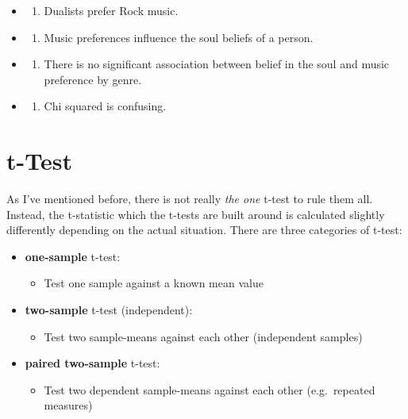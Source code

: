 \documentclass[
]{book}
\providecommand{\tightlist}{%
  \setlength{\itemsep}{0pt}\setlength{\parskip}{0pt}}
\begin{document}
\begin{itemize}
\tightlist
\item
  \begin{enumerate}
  \def\labelenumi{(\Alph{enumi})}
  \tightlist
  \item
    Dualists prefer Rock music.\\
  \end{enumerate}
\item
  \begin{enumerate}
  \def\labelenumi{(\Alph{enumi})}
  \setcounter{enumi}{1}
  \tightlist
  \item
    Music preferences influence the soul beliefs of a person.\\
  \end{enumerate}
\item
  \begin{enumerate}
  \def\labelenumi{(\Alph{enumi})}
  \setcounter{enumi}{2}
  \tightlist
  \item
    There is no significant association between belief in the soul and music preference by genre.\\
  \end{enumerate}
\item
  \begin{enumerate}
  \def\labelenumi{(\Alph{enumi})}
  \setcounter{enumi}{3}
  \tightlist
  \item
    Chi squared is confusing.
  \end{enumerate}
\end{itemize}

\section{t-Test}\label{t-test}

As I've mentioned before, there is not really \emph{the one} t-test to rule them all.
Instead, the t-statistic which the t-tests are built around is calculated slightly differently depending on the actual situation.
There are three categories of t-test:

\begin{itemize}
\tightlist
\item
  \textbf{one-sample} t-test:

  \begin{itemize}
  \tightlist
  \item
    Test one sample against a known mean value
  \end{itemize}
\item
  \textbf{two-sample} t-test (independent):

  \begin{itemize}
  \tightlist
  \item
    Test two sample-means against each other (independent samples)
  \end{itemize}
\item
  \textbf{paired two-sample} t-test:

  \begin{itemize}
  \tightlist
  \item
    Test two dependent sample-means against each other (e.g.~repeated measures)
  \end{itemize}
\end{itemize}
\end{document}

